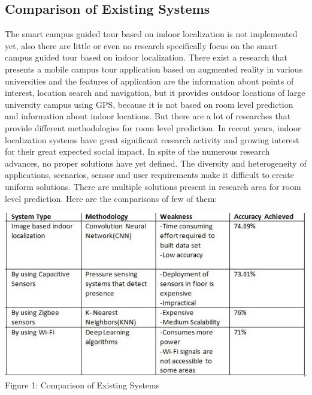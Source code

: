 \documentclass{article}
\begin{document}
\subsection{Comparison of Existing Systems}
The smart campus guided tour based on indoor localization is not implemented yet, also there are little or even no research specifically focus on the smart campus guided tour based on indoor localization. There exist a research that presents a mobile campus tour application based on augmented reality in various universities and the features of application are the information about points of interest, location search and navigation, but it provides outdoor locations of large university campus using GPS, because it is not based on room level prediction and information about indoor locations. But there are a lot of researches that provide different methodologies for room level prediction. In recent years, indoor localization systems have great significant research activity and growing interest for their great expected social impact. In spite of the numerous research advances, no proper solutions have yet defined. The diversity and heterogeneity of applications, scenarios, sensor and user requirements make it difficult to create uniform solutions. There are multiple solutions present in research area for room level prediction\cite{wei2018end}. Here are the comparisons of few of them:


\begin{center}
\includegraphics[scale=0.8]{abc}
\\Figure 1: Comparison of Existing Systems
\label{fig:five}
\end{center}
\end{document}
